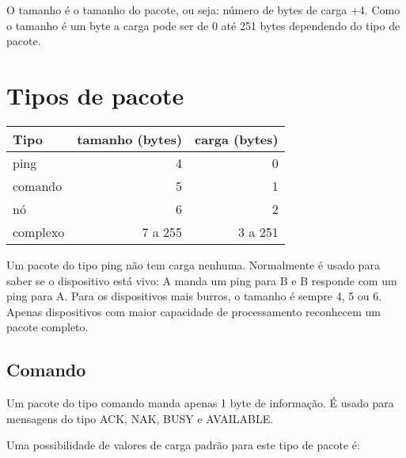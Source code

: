 \documentclass[11pt,	 papera4]{article}
\begin{document}
O tamanho é o tamanho do pacote, ou seja: número de bytes de carga +4. Como o tamanho é um byte a carga pode ser de 0 até 251 bytes dependendo do tipo de pacote.

\section{Tipos de pacote}
\label{sec-1}



\begin{center}
\begin{tabular}{lrr}
\hline
 Tipo      &  tamanho (bytes)  &  carga (bytes)  \\
\hline
 ping      &                4  &              0  \\
 comando   &                5  &              1  \\
 nó        &                6  &              2  \\
 complexo  &          7 a 255  &        3 a 251  \\
\hline
\end{tabular}
\end{center}



Um pacote do tipo ping não tem carga nenhuma. Normalmente é usado para saber se o dispositivo está vivo: A manda um ping para B e B responde com um ping para A. Para os dispositivos mais burros, o tamanho é sempre 4, 5 ou 6. Apenas dispositivos com maior capacidade de processamento reconhecem um pacote completo.
\newpage
\subsection{Comando}
\label{sec-1.1}


Um pacote do tipo comando manda apenas 1 byte de informação. É usado para mensagens do tipo ACK, NAK, BUSY e AVAILABLE.

Uma possibilidade de valores de carga padrão para este tipo de pacote é:
\end{document}
